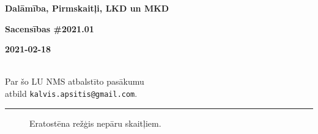 \documentclass[a4paper,12pt]{article}
\begin{document}
\begin{center}
\parbox{3.5cm}{\flushleft\bf Dalāmība, Pirmskaitļi, LKD un MKD} \hfill {\bf\LARGE Sacensības \#2021.01} \hfill \parbox{3.5cm}{\flushright\bf 2021-02-18} \\[2pt]
{\rm\footnotesize Par šo LU NMS atbalstīto pasākumu\\ atbild {\tt kalvis.apsitis@gmail.com}.}
\end{center}

\hrule



\vspace{10pt}
\begin{figure}[!htb]
\caption{\label{fig:eratosthenes-with-17} Eratostēna režģis nepāru skaitļiem.}
\end{figure}
\end{document}

